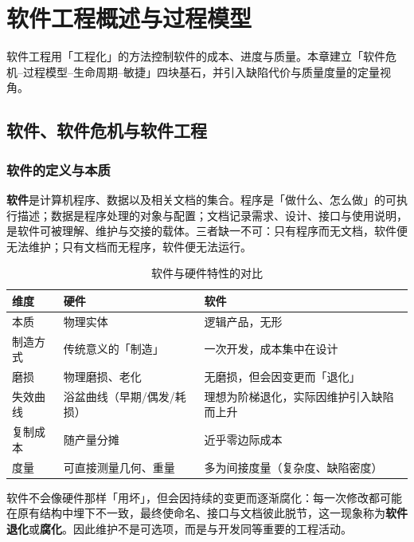 \clearpage
\begingroup
\let\clearpage\relax
\let\cleardoublepage\relax
\vspace*{\fill}
\chapter{软件工程概述与过程模型}
\begin{center}
软件工程用「工程化」的方法控制软件的成本、进度与质量。本章建立「软件危机--过程模型--生命周期--敏捷」四块基石，并引入缺陷代价与质量度量的定量视角。
\end{center}
\vspace*{\fill}
\endgroup
\clearpage

\section{软件、软件危机与软件工程}

\subsection{软件的定义与本质}

\textbf{软件}是计算机程序、数据以及相关文档的集合。程序是「做什么、怎么做」的可执行描述；数据是程序处理的对象与配置；文档记录需求、设计、接口与使用说明，是软件可被理解、维护与交接的载体。三者缺一不可：只有程序而无文档，软件便无法维护；只有文档而无程序，软件便无法运行。

\begin{table}[H]
\centering
\caption{软件与硬件特性的对比}
\begin{tabulary}{\textwidth}{LLL}
\toprule
维度 & 硬件 & 软件 \\
\midrule
本质 & 物理实体 & 逻辑产品，无形 \\
制造方式 & 传统意义的「制造」 & 一次开发，成本集中在设计 \\
磨损 & 物理磨损、老化 & 无磨损，但会因变更而「退化」 \\
失效曲线 & 浴盆曲线（早期/偶发/耗损） & 理想为阶梯退化，实际因维护引入缺陷而上升 \\
复制成本 & 随产量分摊 & 近乎零边际成本 \\
度量 & 可直接测量几何、重量 & 多为间接度量（复杂度、缺陷密度） \\
\bottomrule
\end{tabulary}
\end{table}

\noindent 软件不会像硬件那样「用坏」，但会因持续的变更而逐渐腐化：每一次修改都可能在原有结构中埋下不一致，最终使命名、接口与文档彼此脱节，这一现象称为\textbf{软件退化}或\textbf{腐化}。因此维护不是可选项，而是与开发同等重要的工程活动。

